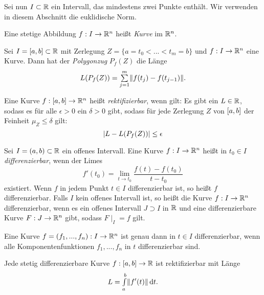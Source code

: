\documentclass{cheat-sheet}
\begin{document}
\begin{nota}
Sei nun $I \subset \mathbb{R}$ ein Intervall, das mindestens zwei Punkte enthält. Wir verwenden in diesem Abschnitt die euklidische Norm.
\end{nota}

\begin{defn}
Eine stetige Abbildung $f : I \to \mathbb{R}^n$ heißt \emph{Kurve} im $\mathbb{R}^n$.\\
\end{defn}

\begin{defn}
Sei $I = \left[ a, b \right] \subset \mathbb{R}$ mit Zerlegung $Z = \{ a = t_0 < ... < t_m = b \}$ und $f : I \to \mathbb{R}^n$ eine Kurve. Dann hat der \emph{Polygonzug} $P_f(Z)$ die Länge
\[ L(P_f(Z)) = \sum_{j = 1}^{m} \norm{f(t_j) - f(t_{j-1})}. \]
\end{defn}

\begin{defn}
Eine Kurve $f : \left[ a, b \right] \to \mathbb{R}^n$ heißt \emph{rektifizierbar}, wenn gilt: Es gibt ein $L \in \mathbb{R}$, sodass es für alle $\epsilon > 0$ ein $\delta > 0$ gibt, sodass für jede Zerlegung $Z$ von $\left[ a, b \right]$ der Feinheit $\mu_Z \le \delta$ gilt:
\[ \lvert L - L(P_f(Z))\rvert \le \epsilon \]
\end{defn}


\begin{defn}
Sei $I = (a, b) \subset \mathbb{R}$ ein offenes Intervall. Eine Kurve $f : I \to \mathbb{R}^n$ heißt in $t_0 \in I$ \emph{differenzierbar}, wenn der Limes
\[ f'(t_0) = \lim_{t \to t_0} \frac{f(t) - f(t_0)}{t - t_0} \]
existiert. Wenn $f$ in jedem Punkt $t \in I$ differenzierbar ist, so heißt $f$ differenzierbar.
Falls $I$ kein offenes Intervall ist, so heißt die Kurve $f : I \to \mathbb{R}^n$ differenzierbar, wenn es ein offenes Intervall $J \supset I$ in $\mathbb{R}$ und eine differenzierbare Kurve $F : J \to \mathbb{R}^n$ gibt, sodass $F\mid_{I} = f$ gilt.
\end{defn}

\begin{bem}
Eine Kurve $f = (f_1, ..., f_n) : I \to \mathbb{R}^n$ ist genau dann in $t \in I$ differenzierbar, wenn alle Komponentenfunktionen $f_1, ..., f_n$ in $t$ differenzierbar sind.
\end{bem}

\begin{satz}
Jede stetig differenzierbare Kurve $f : \left[ a, b \right] \to \mathbb{R}$ ist rektifizierbar mit Länge
\[ L = {\textstyle \int\limits_{a}^{b}} \lVert f'(t)\rVert \,\mathrm{d} t. \]
\end{satz}
\end{document}
